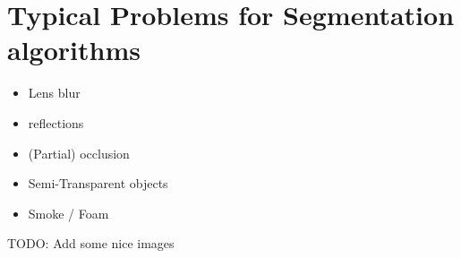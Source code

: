 \section{Typical Problems for Segmentation algorithms}

\begin{itemize}
    \item Lens blur
    \item reflections
    \item (Partial) occlusion
    \item Semi-Transparent objects
    \item Smoke / Foam
\end{itemize}

TODO: Add some nice images
